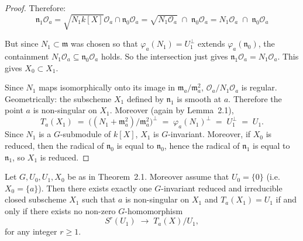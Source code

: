 \documentclass[12pt]{article}
\begin{document}
\begin{proof}
Therefore:
\[\mathfrak{n}_1\mathcal{O}_a
= \sqrt{N_1k[X]}\mathcal{O}_a \cap \mathfrak{n}_0\mathcal{O}_a
= \sqrt{N_1\mathcal{O}_a}\;\cap\; \mathfrak{n}_0\mathcal{O}_a
= N_1\mathcal{O}_a \;\cap\; \mathfrak{n}_0\mathcal{O}_a\]

But since $N_1\subset \mathfrak{m}$ was chosen so that $\varphi_a(N_1)=U_1^\perp$ extends $\varphi_a(\mathfrak{n}_0)$, the containment
$N_1\mathcal{O}_a \subseteq \mathfrak{n}_0\mathcal{O}_a$
holds. So the intersection just gives
$\mathfrak{n}_1\mathcal{O}_a = N_1\mathcal{O}_a$. This gives $X_0 \subset X_1$.

Since $N_1$ maps isomorphically onto its image in $\mathfrak{m}_a/\mathfrak{m}_a^2$, $\mathcal{O}_a / N_1\mathcal{O}_a$ is regular. Geometrically: the subscheme $X_1$ defined by $\mathfrak{n}_1$ is smooth at $a$. Therefore the point $a$ is non-singular on $X_1$. Moreover (again by Lemma~2.1),
\[
   T_a(X_1) \;=\; \big( (N_1 + \mathfrak{m}_a^2)/\mathfrak{m}_a^2 \big)^\perp 
   \;=\; \varphi_a(N_1)^\perp 
   \;=\; U_1^\perp 
   \;=\; U_1.
\]
Since $N_1$ is a $G$-submodule of $k[X]$, $X_1$ is $G$-invariant.  
Moreover, if $X_0$ is reduced, then the radical of $\mathfrak{n}_0$ is equal to $\mathfrak{n}_0$, hence the radical of $\mathfrak{n}_1$ is equal to $\mathfrak{n}_1$, so $X_1$ is reduced.
\end{proof}

\begin{theorem}[2.2]
Let $G, U_0, U_1, X_0$ be as in Theorem~2.1. Moreover assume that 
$U_0 = \{0\}$ (i.e.\ $X_0 = \{a\}$). Then there exists exactly one 
$G$-invariant reduced and irreducible closed subscheme $X_1$ such that 
$a$ is non-singular on $X_1$ and $T_a(X_1) = U_1$ if and only if there exists 
no non-zero $G$-homomorphism
\[
   S^r(U_1) \;\longrightarrow\; T_a(X)/U_1,
\]
for any integer $r \ge 1$.
\end{theorem}
\end{document}
